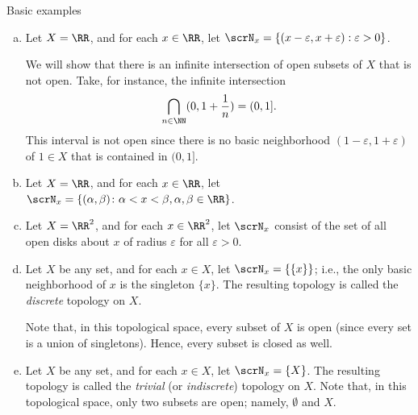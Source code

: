 \begin{example} Basic examples
  \label{exa:basic-topological-spaces}

  \begin{enumerate}[(a)]

  \item
    Let $X=\RR$, and for each $x\in \RR$,  let $\scrN_x=\{(x-\varepsilon , x+\varepsilon):\varepsilon >0\}$.

    We will show that there is an infinite intersection of open subsets of $X$ that is not open.
    Take, for instance, the infinite intersection \[\bigcap\limits_{n\in \NN}(0,1+\frac{1}{n})=(0,1]\text{.}\]
    This interval is not open since there is no basic neighborhood $(1-\varepsilon,1+\varepsilon)$ of $1\in X$ that is contained in $(0,1]$.

  \item
    Let $X=\RR$, and for each $x\in \RR$,  let $\scrN_x=\{(\alpha , \beta) \colon \alpha<x<\beta, \alpha,\beta\in\RR \}$.

  \item
    Let $X=\RR^2$, and for each $x\in \RR^2$, let $\scrN_x$ consist of the set of all open disks about $x$ of radius $\varepsilon$ for all $\varepsilon >0$.

  \item
    Let $X$ be any set, and for each $x\in X$, let $\scrN_x = \{\{x\}\}$;
    i.e., the only basic neighborhood of $x$ is the singleton $\{x\}$.
    The resulting topology is called the \emph{discrete} topology on $X$.

    Note that, in this topological space, every subset of $X$ is open (since every set is a union of singletons).
    Hence, every subset is closed as well.

  \item
    Let $X$ be any set, and for each $x\in X$, let $\scrN_x = \{X\}$.
    The resulting topology is called the \emph{trivial} (or \emph{indiscrete}) topology on $X$.
    Note that, in this topological space, only two subsets are open;
    namely, $\emptyset$ and $X$.

  \end{enumerate}

\end{example}

